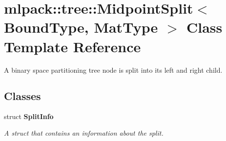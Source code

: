 \section{mlpack\+:\+:tree\+:\+:Midpoint\+Split$<$ Bound\+Type, Mat\+Type $>$ Class Template Reference}
\label{classmlpack_1_1tree_1_1MidpointSplit}


A binary space partitioning tree node is split into its left and right child.  


\subsection*{Classes}
\begin{DoxyCompactItemize}
\item 
struct {\bf Split\+Info}
\begin{DoxyCompactList}\small\item\em A struct that contains an information about the split. \end{DoxyCompactList}\end{DoxyCompactItemize}
